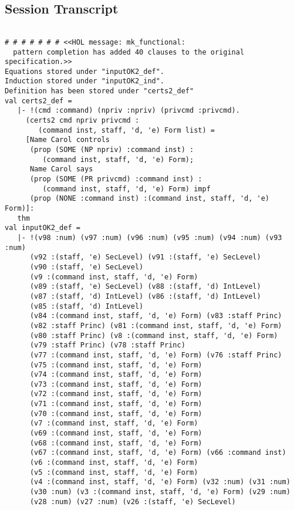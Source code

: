 \documentclass{report}
\begin{document}
\subsection{Session Transcript}
\label{trans5}
\begin{session}
  \begin{scriptsize}
\begin{verbatim}

# # # # # # # <<HOL message: mk_functional: 
  pattern completion has added 40 clauses to the original specification.>>
Equations stored under "inputOK2_def".
Induction stored under "inputOK2_ind".
Definition has been stored under "certs2_def"
val certs2_def =
   |- !(cmd :command) (npriv :npriv) (privcmd :privcmd).
     (certs2 cmd npriv privcmd :
        (command inst, staff, 'd, 'e) Form list) =
     [Name Carol controls
      (prop (SOME (NP npriv) :command inst) :
         (command inst, staff, 'd, 'e) Form);
      Name Carol says
      (prop (SOME (PR privcmd) :command inst) :
         (command inst, staff, 'd, 'e) Form) impf
      (prop (NONE :command inst) :(command inst, staff, 'd, 'e) Form)]:
   thm
val inputOK2_def =
   |- !(v98 :num) (v97 :num) (v96 :num) (v95 :num) (v94 :num) (v93 :num)
      (v92 :(staff, 'e) SecLevel) (v91 :(staff, 'e) SecLevel)
      (v90 :(staff, 'e) SecLevel)
      (v9 :(command inst, staff, 'd, 'e) Form)
      (v89 :(staff, 'e) SecLevel) (v88 :(staff, 'd) IntLevel)
      (v87 :(staff, 'd) IntLevel) (v86 :(staff, 'd) IntLevel)
      (v85 :(staff, 'd) IntLevel)
      (v84 :(command inst, staff, 'd, 'e) Form) (v83 :staff Princ)
      (v82 :staff Princ) (v81 :(command inst, staff, 'd, 'e) Form)
      (v80 :staff Princ) (v8 :(command inst, staff, 'd, 'e) Form)
      (v79 :staff Princ) (v78 :staff Princ)
      (v77 :(command inst, staff, 'd, 'e) Form) (v76 :staff Princ)
      (v75 :(command inst, staff, 'd, 'e) Form)
      (v74 :(command inst, staff, 'd, 'e) Form)
      (v73 :(command inst, staff, 'd, 'e) Form)
      (v72 :(command inst, staff, 'd, 'e) Form)
      (v71 :(command inst, staff, 'd, 'e) Form)
      (v70 :(command inst, staff, 'd, 'e) Form)
      (v7 :(command inst, staff, 'd, 'e) Form)
      (v69 :(command inst, staff, 'd, 'e) Form)
      (v68 :(command inst, staff, 'd, 'e) Form)
      (v67 :(command inst, staff, 'd, 'e) Form) (v66 :command inst)
      (v6 :(command inst, staff, 'd, 'e) Form)
      (v5 :(command inst, staff, 'd, 'e) Form)
      (v4 :(command inst, staff, 'd, 'e) Form) (v32 :num) (v31 :num)
      (v30 :num) (v3 :(command inst, staff, 'd, 'e) Form) (v29 :num)
      (v28 :num) (v27 :num) (v26 :(staff, 'e) SecLevel)

\end{verbatim}
\end{scriptsize}
\end{session}
\end{document}
